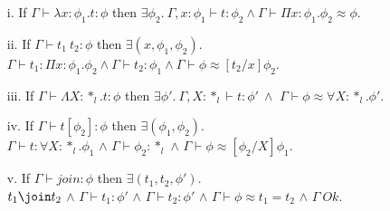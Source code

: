 \begin{lemma}
  \label{lemma:inversion_ssfe}
  \begin{itemize}\itemsep2pt
  \item[]
  \item[i.] If $\Gamma \vdash \lambda x:\phi_1.t:\phi$
    then $\exists \phi_2.\ \Gamma,x:\phi_1 \vdash t:\phi_2 \land 
    \Gamma \vdash \Pi x:\phi_1.\phi_2 \approx \phi$.

  \item[ii.] If $\Gamma \vdash t_1\ t_2:\phi$ then $\exists (x,\phi_1, \phi_2).$\\
    $\Gamma \vdash t_1:\Pi x:\phi_1.\phi_2 \land
    \Gamma \vdash t_2:\phi_1 \land \Gamma \vdash \phi \approx
     [t_2/x]\phi_2$.

  \item[iii.] If $\Gamma \vdash \Lambda X:*_l.t:\phi$
    then $\exists \phi'.\ \Gamma,X:*_l \vdash t:\phi'\ \land $
    $\Gamma \vdash \phi \approx \forall X:*_l.\phi'$.

  \item[iv.] If $\Gamma \vdash t[\phi_2]:\phi$ then 
    $\exists (\phi_1, \phi_2)$. \\
    $\Gamma \vdash t:\forall X:*_l.\phi_1$ $\land$
    $\Gamma \vdash \phi_2:*_l$ $\land$ 
    $\Gamma \vdash \phi \approx [\phi_2/X]\phi_1$.

  \item[v.] If $\Gamma \vdash join:\phi$ then
    $\exists (t_1,t_2,\phi')$.\\
    $t_1 \join t_2$ $\land$
    $\Gamma \vdash t_1:\phi'$ $\land$
    $\Gamma \vdash t_2:\phi'$ $\land$
    $\Gamma \vdash \phi \approx t_1 = t_2$ $\land$
    $\Gamma\ Ok$.
  \end{itemize}
\end{lemma}
